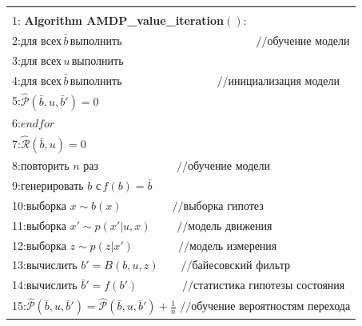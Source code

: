 \documentclass[10pt,a4paper]{article}
\begin{document}
\begin{table}[H]
\begin{center}
\begin{tabular}{|l|}
\hline
{}\\
1:\textbf{ Algorithm AMDP\_value\_iteration}$():$\\
2:\hspace{5mm}$\textit{для всех}\,\bar{b}\,\textit{выполнить}\qquad\qquad\qquad\qquad\qquad\qquad//\text{обучение модели}$\\
3:\hspace{10mm}$\textit{для всех}\,u\,\textit{выполнить}$\\
4:\hspace{15mm}$\textit{для всех}\,\bar{b}\,\textit{выполнить}\,\,\,\qquad\qquad\qquad\qquad//\text{инициализация модели}$\\
5:\hspace{20mm}$\hat{\mathcal{P}}(\bar{b},u,\bar{b}')=0$\\
6:\hspace{15mm}$\textit{endfor}$\\
7:\hspace{20mm}$\hat{\mathcal{R}}(\bar{b},u)=0$\\
8:\hspace{15mm}$\textit{повторить n раз}\quad\qquad\qquad\qquad//\text{обучение модели}$\\
9:\hspace{20mm}$\textit{генерировать b с}\,f(b)=\bar{b}$\\
10:\hspace{19mm}$\textit{выборка}\,\,x\sim b(x)\,\,\,\qquad\qquad//\text{выборка гипотез}$\\
11:\hspace{19mm}$\textit{выборка}\,\,x'\sim p(x'|u,x)\,\,\qquad//\text{модель движения}$\\
12:\hspace{19mm}$\textit{выборка}\,\,z\sim p(z|x')\qquad\qquad//\text{модель измерения}$\\
13:\hspace{19mm}$\textit{вычислить}\,\,b'=B(b,u,z)\qquad//\text{байесовский фильтр}$\\
14:\hspace{19mm}$\textit{вычислить}\,\,\bar{b}'=f(b')\qquad\qquad//\text{статистика гипотезы состояния}$\\
15:\hspace{19mm}$\hat{\mathcal{P}}(\bar{b},u,\bar{b}')=\hat{\mathcal{P}}(\bar{b},u,\bar{b}')+\frac{1}{n}\,\,//\text{обучение вероятностям перехода}$\\

\end{tabular}
\end{center}
\end{table}
\end{document}
